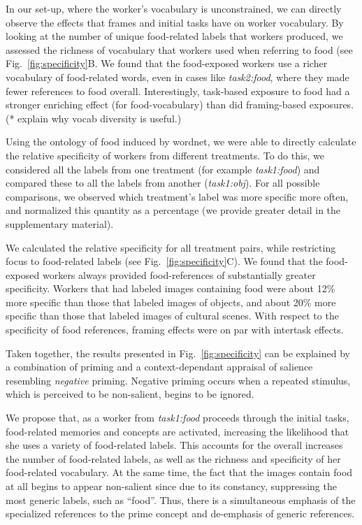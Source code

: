 \documentclass[12pt]{article}
\begin{document}
In our set-up, where the worker's vocabulary is unconstrained, we can 
directly observe the effects that frames and initial tasks have on worker 
vocabulary.  By looking at the number of unique food-related labels that 
workers produced, we assessed the richness of vocabulary that workers used when
referring to food (see Fig.~\ref{fig:specificity}B.  We found that the 
food-exposed workers use a richer vocabulary of 
food-related words, even in cases like \textit{task2:food}, where they 
made fewer references to food overall.  
Interestingly, task-based exposure to food had a stronger enriching effect 
(for food-vocabulary) than did framing-based exposures. (* explain why vocab 
diversity is useful.) 

Using the ontology of food induced by wordnet, we were able to directly
calculate the relative specificity of workers from different treatments.
To do this, we considered all the labels from one treatment
(for example \textit{task1:food}) and compared these to all the labels from 
another (\textit{task1:obj}).  For all possible comparisons, we observed 
which treatment's label was more specific more often, and normalized this
quantity as a percentage (we provide greater detail in the supplementary 
material).

We calculated the relative specificity for all treatment pairs, while 
restricting focus to 
food-related labels (see Fig.~\ref{fig:specificity}C).  We found that 
the food-exposed workers always provided food-references of substantially 
greater specificity.  Workers that had labeled images containing food 
were about 12\% more specific than those that labeled images of objects,
and about 20\% more specific than those that labeled images of cultural 
scenes.  With respect to the specificity of food references, framing effects 
were on par with intertask effects.

Taken together, the results presented in Fig.~\ref{fig:specificity} can 
be explained by a combination of priming and a context-dependant appraisal
of salience resembling \textit{negative} priming.
Negative priming occurs when a repeated stimulus, which is perceived to be
non-salient, begins to be ignored.  

We propose that, as a worker from \textit{task1:food} proceeds through the 
initial tasks, food-related memories and concepts are activated, increasing 
the likelihood that she uses a variety of food-related labels.  This accounts
for the overall increases the number of food-related labels, as well as the 
richness and specificity of her food-related vocabulary.  At the same time,
the fact that the images contain food at all begins to appear non-salient 
since due to its constancy, suppressing the most generic labels, such as 
``food''.  Thus, there is a simultaneous emphasis of the specialized 
references to the prime concept and de-emphasis of generic references. 
\end{document}
